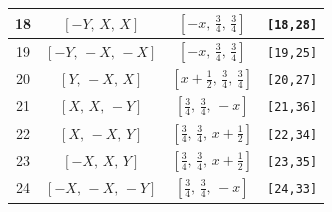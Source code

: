 \documentclass[fleqn,8pt]{jsarticle}
\begin{document}
\begin{longtable}{cccc}
18 & $\left[ - Y,\, X,\, X \right]$ & $\left[ - x,\, \frac{3}{4},\, \frac{3}{4} \right]$ & {\tt [18,28]} \\ \hline
19 & $\left[ - Y,\, - X,\, - X \right]$ & $\left[ - x,\, \frac{3}{4},\, \frac{3}{4} \right]$ & {\tt [19,25]} \\ \hline
20 & $\left[ Y,\, - X,\, X \right]$ & $\left[ x + \frac{1}{2},\, \frac{3}{4},\, \frac{3}{4} \right]$ & {\tt [20,27]} \\ \hline
21 & $\left[ X,\, X,\, - Y \right]$ & $\left[ \frac{3}{4},\, \frac{3}{4},\, - x \right]$ & {\tt [21,36]} \\ \hline
22 & $\left[ X,\, - X,\, Y \right]$ & $\left[ \frac{3}{4},\, \frac{3}{4},\, x + \frac{1}{2} \right]$ & {\tt [22,34]} \\ \hline
23 & $\left[ - X,\, X,\, Y \right]$ & $\left[ \frac{3}{4},\, \frac{3}{4},\, x + \frac{1}{2} \right]$ & {\tt [23,35]} \\ \hline
24 & $\left[ - X,\, - X,\, - Y \right]$ & $\left[ \frac{3}{4},\, \frac{3}{4},\, - x \right]$ & {\tt [24,33]} \\
\end{longtable}
\renewcommand{\arraystretch}{1.2}
\end{document}
